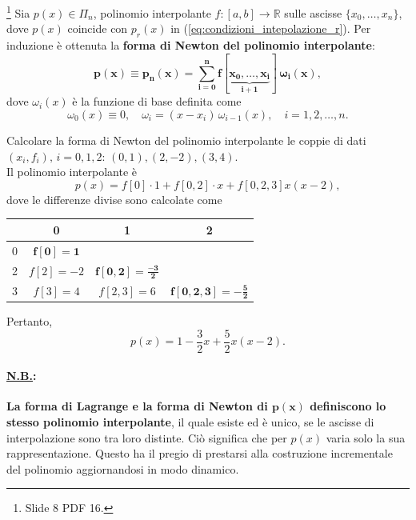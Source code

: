 \begin{remark}\label{rem:polinomio_interpolante_forma_newton}\footnote{Slide 8 PDF 16.}
    Sia $p(x)\in\Pi_n$, polinomio interpolante $f:[a,b]\rightarrow\mathbb{R}$ sulle ascisse $\{x_0,\hdots, x_n\}$, dove $p(x)$ coincide con $p_r(x)$ in (\ref{eq:condizioni_intepolazione_r}).
    Per induzione è ottenuta la \textbf{forma di Newton del polinomio interpolante}: 
    \begin{equation}\label{eq:polinomio_interpolante_newton}
        \boldsymbol{p(x)\equiv p_n(x) = \sum_{i=0}^{n} f[\underbrace{x_0,\hdots, x_i}_{i+1}]\,\omega_i(x)},
    \end{equation}
    dove $\omega_i(x)$ è la funzione di base definita come
    \begin{equation*}
    	\omega_0(x)\equiv 0, \quad \omega_i=(x-x_i)\,\omega_{i-1}(x),\quad i=1,2,\hdots, n.
    \end{equation*}
\end{remark}

\begin{example}
	Calcolare la forma di Newton del polinomio interpolante le coppie di dati $(x_i, f_i),\, i=0,1,2$: $(0,1),(2,-2), (3,4)$.\\
	Il polinomio interpolante è
	\begin{equation*}
		p(x) = f[0]\cdot 1 + f[0,2]\cdot x + f[0,2,3] x(x-2),
	\end{equation*}
	dove le differenze divise sono calcolate come
	\begin{center}
		\begin{tabular}{c|c|c|c} 
			& 0 & 1 & 2\\
			\hline
			0 & $\boldsymbol{f[0]=1}$ & &   \\ 
			2 & $f[2]=-2$ & $\boldsymbol{f[0,2]=\frac{-3}{2}}$ & \\ 
			3 & $f[3]=4$ & $f[2,3]=6$ & $\boldsymbol{f[0,2,3]=-\frac{5}{2}}$
		\end{tabular}
	\end{center}
	Pertanto,
	\begin{equation*}
		p(x) = 1 - \frac{3}{2} x + \frac{5}{2} x(x-2).
	\end{equation*}
\end{example}
\paragraph{\ul{N.B.}:} \textbf{La forma di Lagrange e la forma di Newton di $\boldsymbol{p(x)}$ definiscono lo stesso polinomio interpolante}, il quale esiste ed è unico, se le ascisse di interpolazione sono tra loro distinte. Ciò significa che per $p(x)$ varia solo la sua rappresentazione. Questo ha il pregio di prestarsi alla costruzione incrementale del polinomio aggiornandosi in modo dinamico.

